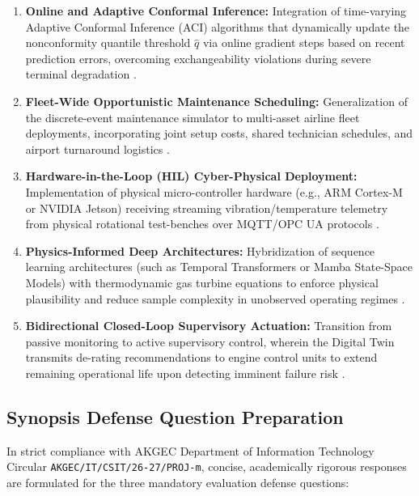 \documentclass[12pt,a4paper]{article}
\begin{document}
\begin{enumerate}[label=\textbf{\Roman*.}]
    \item \textbf{Online and Adaptive Conformal Inference:} Integration of time-varying Adaptive Conformal Inference (ACI) algorithms that dynamically update the nonconformity quantile threshold $\hat{q}$ via online gradient steps based on recent prediction errors, overcoming exchangeability violations during severe terminal degradation \cite{javanmardi2023conformal}.
    \item \textbf{Fleet-Wide Opportunistic Maintenance Scheduling:} Generalization of the discrete-event maintenance simulator to multi-asset airline fleet deployments, incorporating joint setup costs, shared technician schedules, and airport turnaround logistics \cite{cortesgomez2025predictive, lee2023industrial}.
    \item \textbf{Hardware-in-the-Loop (HIL) Cyber-Physical Deployment:} Implementation of physical micro-controller hardware (e.g., ARM Cortex-M or NVIDIA Jetson) receiving streaming vibration/temperature telemetry from physical rotational test-benches over MQTT/OPC UA protocols \cite{walia2026digital, iso23247_1}.
    \item \textbf{Physics-Informed Deep Architectures:} Hybridization of sequence learning architectures (such as Temporal Transformers or Mamba State-Space Models) with thermodynamic gas turbine equations to enforce physical plausibility and reduce sample complexity in unobserved operating regimes \cite{wu2026deep, robinson2026turbofan}.
    \item \textbf{Bidirectional Closed-Loop Supervisory Actuation:} Transition from passive monitoring to active supervisory control, wherein the Digital Twin transmits de-rating recommendations to engine control units to extend remaining operational life upon detecting imminent failure risk \cite{chen2022digital}.
\end{enumerate}

\subsection{Synopsis Defense Question Preparation}
In strict compliance with AKGEC Department of Information Technology Circular \texttt{AKGEC/IT/CSIT/26-27/PROJ-m}, concise, academically rigorous responses are formulated for the three mandatory evaluation defense questions:
\end{document}
